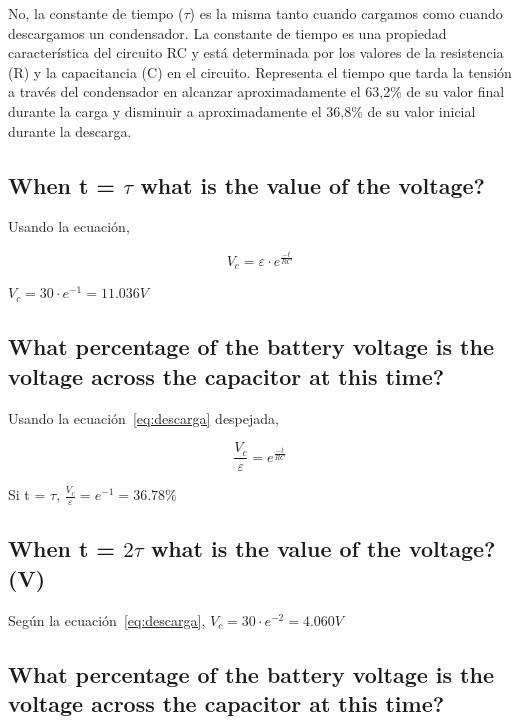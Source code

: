 \documentclass[twocolumn, 12pt]{article}
\begin{document}
No, la constante de tiempo ($\tau$) es la misma tanto
cuando cargamos como cuando descargamos un condensador. La
constante de tiempo es una propiedad característica del
circuito RC y está determinada por los valores de la
resistencia (R) y la capacitancia (C) en el circuito.
Representa el tiempo que tarda la tensión a través del
condensador en alcanzar aproximadamente el 63,2\% de su
valor final durante la carga y disminuir a aproximadamente
el 36,8\% de su valor inicial durante la descarga.

\subsection{When t = $\tau$ what is the value of the voltage?}

Usando la ecuación,

{\large
        \begin{equation}
            V_c = \varepsilon \cdot e^{\frac{-t}{RC}}
        \end{equation}
        \label{eq:descarga}
    }

$V_c = 30 \cdot e^{-1} = 11.036V$

\subsection{What percentage of the battery voltage is the voltage across the capacitor at this time?}

Usando la ecuación~\eqref{eq:descarga} despejada,

{\large
        \begin{equation}
            \frac{V_c}{\varepsilon} = e^{\frac{-t}{RC}}
        \end{equation}
        \label{eq:descarga__porcentaje}
    }

Si t = $\tau$, $\frac{V_c}{\varepsilon} = e^{-1} = 36.78\%$

\subsection{When t = $2\tau$ what is the value of the voltage? (V)}

Según la ecuación~\eqref{eq:descarga}, $V_c = 30 \cdot
    e^{-2} = 4.060V$

\subsection{What percentage of the battery voltage is the voltage across the capacitor at this time?}
\end{document}
